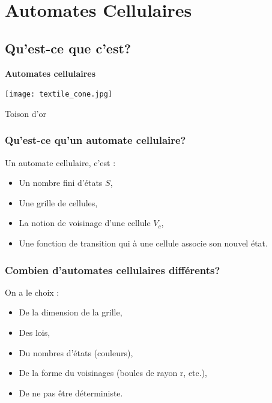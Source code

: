\documentclass{beamer}
\begin{document}
\section{Automates Cellulaires}

\subsection{Qu'est-ce que c'est?}

\begin{frame}
\begin{center}
\textbf{Automates cellulaires}
\end{center}

\begin{center}
\texttt{[image: textile\_cone.jpg]}
\end{center}

\begin{center}Toison d'or\end{center}

\end{frame}


\begin{frame}
\frametitle{Qu'est-ce qu'un automate cellulaire?}
\begin{block}{Un automate cellulaire, c'est :}
	\begin{itemize}
		\item Un nombre fini d'états $S$,
		\item Une grille de cellules,
		\item La notion de voisinage d'une cellule $V_c$,
		\item Une fonction de transition qui à une cellule associe son nouvel état.
	\end{itemize}
\end{block}
\end{frame}

\begin{frame}
\frametitle{Combien d'automates cellulaires différents?}
\begin{block}{On a le choix :}
	\begin{itemize}
	\item De la dimension de la grille,
	\item Des lois,
	\item Du nombres d'états (couleurs),
	\item De la forme du voisinages (boules de rayon r, etc.),
	\item De ne pas être déterministe.
	\end{itemize}
\end{block}
\end{frame}
\end{document}
